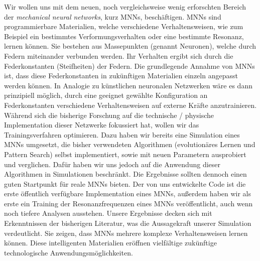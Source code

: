 \documentclass[10pt]{scrartcl}
\newcommand*{\eng}[1]{\textit{#1}}
\newcommand*{\feng}[1]{\eng{#1}}
\begin{document}
Wir wollen uns mit dem neuen, noch vergleichsweise wenig erforschten Bereich der \feng{mechanical neural networks}, kurz MNNs, beschäftigen.
MNNs sind programmierbare Materialien, welche verschiedene Verhaltensweisen, wie zum Beispiel ein bestimmtes Verformungsverhalten oder eine bestimmte Resonanz, lernen können. Sie bestehen aus Massepunkten (genannt Neuronen), welche durch Federn miteinander verbunden werden. Ihr Verhalten ergibt sich durch die Federkonstanten (Steifheiten) der Federn.
Die grundlegende Annahme von MNNs ist, dass diese Federkonstanten in zukünftigen Materialien einzeln angepasst werden können. 
In Analogie zu künstlichen neuronalen Netzwerken wäre es dann prinzipiell möglich, durch eine geeignet gewählte Konfiguration an Federkonstanten verschiedene Verhaltensweisen auf externe Kräfte anzutrainieren.
Während sich die bisherige Forschung auf die technische / physische Implementation dieser Netzwerke fokussiert hat, wollen wir das Trainingsverfahren optimieren.
Dazu haben wir bereits eine Simulation eines MNNs umgesetzt, die bisher verwendeten Algorithmen (evolutionäres Lernen und Pattern Search) selbst implementiert, sowie mit neuen Parametern ausprobiert und verglichen. 
Dafür haben wir uns jedoch auf die Anwendung dieser Algorithmen in Simulationen beschränkt. Die Ergebnisse sollten dennoch einen guten Startpunkt für reale MNNs bieten. Der von uns entwickelte Code ist die erste öffentlich verfügbare Implementation eines MNNs, außerdem haben wir als erste ein Training der Resonanzfrequenzen eines MNNs veröffentlicht, auch wenn noch tiefere Analysen ausstehen.
Unsere Ergebnisse decken sich mit Erkenntnissen der bisherigen Literatur, was die Aussagekraft unserer Simulation verdeutlicht. Sie zeigen, dass MNNs mehrere komplexe Verhaltensweisen lernen können. Diese intelligenten Materialien eröffnen vielfältige zukünftige technologische Anwendungsmöglichkeiten.


\end{document}
